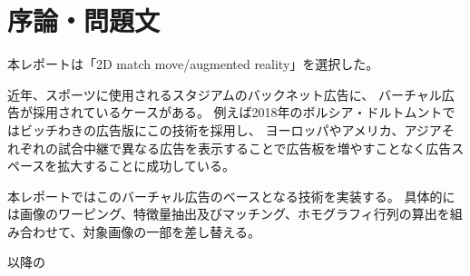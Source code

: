 \section{序論・問題文}
本レポートは「2D match move/augmented reality」を選択した。

近年、スポーツに使用されるスタジアムのバックネット広告に、
バーチャル広告が採用されているケースがある。
例えば2018年のボルシア・ドルトムントではビッチわきの広告版にこの技術を採用し、
ヨーロッパやアメリカ、アジアそれぞれの試合中継で異なる広告を表示することで広告板を増やすことなく広告スペースを拡大することに成功している\cite{t}。

本レポートではこのバーチャル広告のベースとなる技術を実装する。
具体的には画像のワーピング、特徴量抽出及びマッチング、ホモグラフィ行列の算出を組み合わせて、対象画像の一部を差し替える。

以降の
